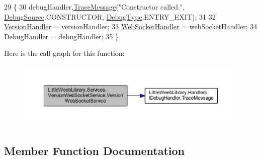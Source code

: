 \begin{DoxyCode}
29         \{
30             debugHandler.\mbox{\hyperlink{interface_little_weeb_library_1_1_handlers_1_1_i_debug_handler_a2e405bc3492e683cd3702fae125221bc}{TraceMessage}}(\textcolor{stringliteral}{"Constructor called."}, 
      \mbox{\hyperlink{namespace_little_weeb_library_1_1_handlers_a2a6ca0775121c9c503d58aa254d292be}{DebugSource}}.CONSTRUCTOR, \mbox{\hyperlink{namespace_little_weeb_library_1_1_handlers_ab66019ed40462876ec4e61bb3ccb0a62}{DebugType}}.ENTRY\_EXIT);
31 
32             \mbox{\hyperlink{class_little_weeb_library_1_1_handlers_1_1_version_handler}{VersionHandler}} = versionHandler;
33             \mbox{\hyperlink{class_little_weeb_library_1_1_handlers_1_1_web_socket_handler}{WebSocketHandler}} = webSocketHandler;
34             \mbox{\hyperlink{class_little_weeb_library_1_1_handlers_1_1_debug_handler}{DebugHandler}} = debugHandler;
35         \}
\end{DoxyCode}
Here is the call graph for this function\+:\nopagebreak
\begin{figure}[H]
\begin{center}
\leavevmode
\includegraphics[width=350pt]{class_little_weeb_library_1_1_services_1_1_version_web_socket_service_ac36d79cd9d964d06594350e5971adb5e_cgraph}
\end{center}
\end{figure}


\subsection{Member Function Documentation}
\mbox{\label{class_little_weeb_library_1_1_services_1_1_version_web_socket_service_af1a64a24e2d1b2299b82ba81b3c4a537}} 
